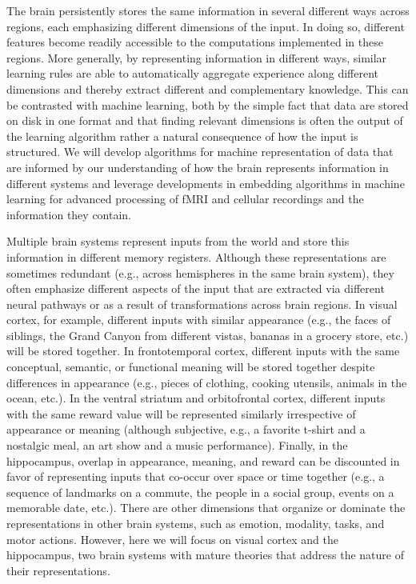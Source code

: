 \let\tilde\widetilde
\def\SS{{\mathbb S}}
\def\X{{\mathbb X}}
\def\bb{b}
\def\noisesd{\sigma}
\def\C{{\mathcal C}}
\def\A{{\mathcal A}}
\def\bigbracket#1#2#3{
\left[ 
\mbox{\begin{minipage}{#1}{
\vskip#2
#3
\vskip#2
\mbox{\ }
}\end{minipage}}
\right]
}

\label{sec:aim2}

The brain persistently stores the same information in several
different ways across regions, each emphasizing different dimensions
of the input. In doing so, different features become readily
accessible to the computations implemented in these regions. More
generally, by representing information in different ways, similar
learning rules are able to automatically aggregate experience along
different dimensions and thereby extract different and complementary
knowledge. This can be contrasted with machine learning, both by the
simple fact that data are stored on disk in one format and that
finding relevant dimensions is often the output of the learning
algorithm rather a natural consequence of how the input is structured.
We will develop algorithms for machine representation of data that are
informed by our understanding of how the brain represents information
in different systems and leverage developments in embedding algorithms
in machine learning for advanced processing of fMRI and cellular
recordings and the information they contain.

\biobackground{} Multiple brain systems represent inputs from the
world and store this information in different memory registers.
Although these representations are sometimes redundant (e.g., across
hemispheres in the same brain system), they often emphasize different
aspects of the input that are extracted via different neural pathways
or as a result of transformations across brain regions. In visual
cortex, for example, different inputs with similar appearance (e.g.,
the faces of siblings, the Grand Canyon from different vistas, bananas
in a grocery store, etc.) will be stored together. In frontotemporal
cortex, different inputs with the same conceptual, semantic, or
functional meaning will be stored together despite differences in
appearance (e.g., pieces of clothing, cooking utensils, animals in the
ocean, etc.). In the ventral striatum and orbitofrontal cortex,
different inputs with the same reward value will be represented
similarly irrespective of appearance or meaning (although subjective,
e.g., a favorite t-shirt and a nostalgic meal, an art show and a music
performance). Finally, in the hippocampus, overlap in appearance,
meaning, and reward can be discounted in favor of representing inputs
that co-occur over space or time together (e.g., a sequence of
landmarks on a commute, the people in a social group, events on a
memorable date, etc.). There are other dimensions that organize or
dominate the representations in other brain systems, such as emotion,
modality, tasks, and motor actions. However, here we will focus on
visual cortex and the hippocampus, two brain systems with mature
theories that address the nature of their representations.

